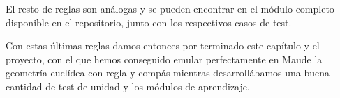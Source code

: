 El resto de reglas son análogas y se pueden encontrar en el módulo completo disponible en el repositorio, junto con los respectivos casos de test. \par

Con estas últimas reglas damos entonces por terminado este capítulo y el proyecto, con el que hemos conseguido emular perfectamente en Maude la geometría euclídea con regla y compás mientras desarrollábamos una buena cantidad de test de unidad y los módulos de aprendizaje. \par

